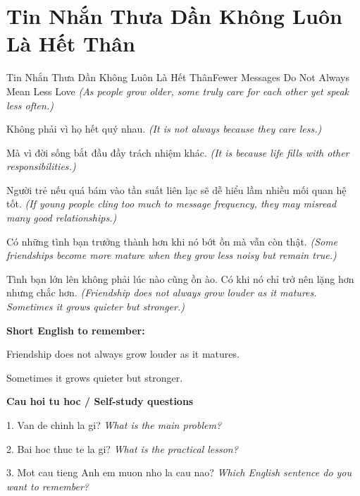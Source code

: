 \section{Tin Nhắn Thưa Dần Không Luôn Là Hết Thân}
\begin{truyen}{Tin Nhắn Thưa Dần Không Luôn Là Hết Thân}{Fewer Messages Do Not Always Mean Less Love}
\textit{(As people grow older, some truly care for each other yet speak less often.)}

Không phải vì họ hết quý nhau.
\textit{(It is not always because they care less.)}

Mà vì đời sống bắt đầu đầy trách nhiệm khác.
\textit{(It is because life fills with other responsibilities.)}

Người trẻ nếu quá bám vào tần suất liên lạc sẽ dễ hiểu lầm nhiều mối quan hệ tốt.
\textit{(If young people cling too much to message frequency, they may misread many good relationships.)}

Có những tình bạn trưởng thành hơn khi nó bớt ồn mà vẫn còn thật.
\textit{(Some friendships become more mature when they grow less noisy but remain true.)}

\end{truyen}

\begin{baihoc}
Tình bạn lớn lên không phải lúc nào cũng ồn ào. Có khi nó chỉ trở nên lặng hơn nhưng chắc hơn.
\textit{(Friendship does not always grow louder as it matures. Sometimes it grows quieter but stronger.)}
\end{baihoc}

\begin{ghinhoanh}
\textbf{Short English to remember:}

Friendship does not always grow louder as it matures.

Sometimes it grows quieter but stronger.

\end{ghinhoanh}

\begin{tuhocnhanh}
\textbf{Cau hoi tu hoc / Self-study questions}

1. Van de chinh la gi? \textit{What is the main problem?}

2. Bai hoc thuc te la gi? \textit{What is the practical lesson?}

3. Mot cau tieng Anh em muon nho la cau nao? \textit{Which English sentence do you want to remember?}
\end{tuhocnhanh}
\ngancach

